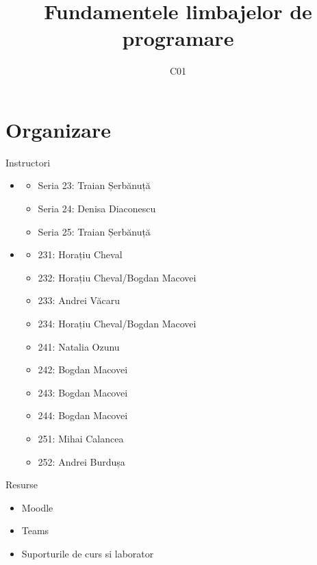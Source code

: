 \documentclass[xcolor=pdftex,romanian,colorlinks]{beamer}
\title[FLP]{Fundamentele limbajelor de programare}
\subtitle{C01}
\date{}
\begin{document}
\begin{frame}
  \titlepage
\end{frame}

\section{\color{section-color} Organizare}

\begin{frame}{Instructori}
\begin{itemize}
	\item {}
	\begin{itemize}
		\item Seria 23: Traian Șerbănuță
		\item Seria 24: Denisa Diaconescu
		\item Seria 25: Traian Șerbănuță
	\end{itemize}
	\vspace{.2cm}
	\item {}
	\begin{itemize}
		\item 231: Horațiu Cheval
		\item 232: Horațiu Cheval/Bogdan Macovei
		\item 233: Andrei V\u acaru
		\item 234: Horațiu Cheval/Bogdan Macovei
		\item 241: Natalia Ozunu
		\item 242: Bogdan Macovei
		\item 243: Bogdan Macovei
		\item 244: Bogdan Macovei
		\item 251: Mihai Calancea
		\item 252: Andrei Burdușa
	\end{itemize}
\end{itemize}
\end{frame}


\begin{frame}{Resurse}
\begin{itemize}
	\item Moodle 
	\vspace{.2cm}
	\item Teams \\ 
	\vspace{.2cm}
	\item Suporturile de curs si laborator \\ 
\end{itemize}
\end{frame}
\end{document}
